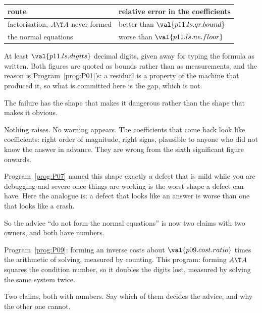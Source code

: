 \begin{fr}
\begin{tabularx}{\linewidth}{@{}lX@{}}
\toprule
\textbf{route} & \textbf{relative error in the coefficients} \\
\midrule
factorisation, $A\T A$ never formed & better than $\val{p11.ls.qr.bound}$ \\
the normal equations & worse than $\val{p11.ls.ne.floor}$ \\
\bottomrule
\end{tabularx}

\medskip
At least $\val{p11.ls.digits}$ decimal digits, given away for typing the
formula as written. Both figures are quoted as bounds rather than as
measurements, and the reason is Program~\ref{prog:P01}'s: a residual is a
property of the machine that produced it, so what is committed here is the gap,
which is not.
\end{fr}

\begin{fr}
The failure has the shape that makes it dangerous rather than the shape that
makes it obvious.

Nothing raises. No warning appears. The coefficients that come back look like
coefficients: right order of magnitude, right signs, plausible to anyone who
did not know the answer in advance. They are wrong from the sixth
significant figure onwards.

Program~\ref{prog:P07} named this shape exactly \dash{} a defect that is mild
while you are debugging and severe once things are working is the worst shape a
defect can have. Here the analogue is: a defect that looks like an answer is
worse than one that looks like a crash.
\end{fr}

\begin{fr}
So the advice \enquote{do not form the normal equations} is now two claims with
two owners, and both have numbers.

Program~\ref{prog:P09}: forming an inverse costs about
$\val{p09.cost.ratio}$ times the arithmetic of solving, measured by counting.
This program: forming $A\T A$ squares the condition number, so it doubles the
digits lost, measured by solving the same system twice.

Two claims, both with numbers. Say which of them decides the advice, and why
the other one cannot.
\dotline
\nextframe
\end{fr}

